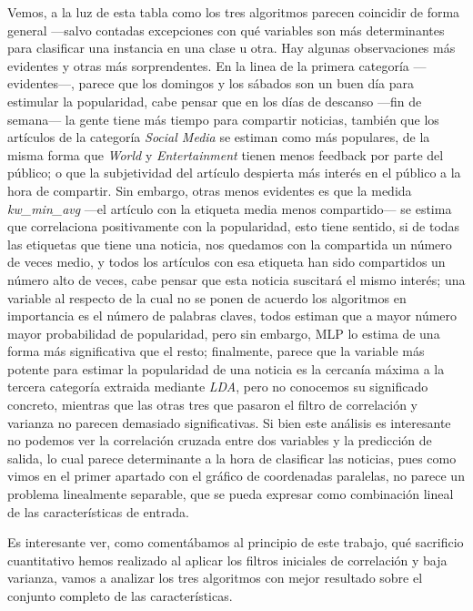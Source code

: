 \documentclass{article}
\begin{document}
Vemos, a la luz de esta tabla como los tres algoritmos parecen coincidir de forma general ---salvo contadas excepciones con qué variables son más determinantes para clasificar una instancia en una clase u otra. Hay algunas observaciones más evidentes y otras más sorprendentes. En la linea de la primera categoría ---evidentes---, parece que los domingos y los sábados son un buen día para estimular la popularidad, cabe pensar que en los días de descanso ---fin de semana--- la gente tiene más tiempo para compartir noticias, también que los artículos de la categoría \textit{Social Media} se estiman como más populares, de la misma forma que \textit{World} y \textit{Entertainment} tienen menos feedback por parte del público; o que la subjetividad del artículo despierta más interés en el público a la hora de compartir. Sin embargo, otras menos evidentes es que la medida \textit{kw\_min\_avg} ---el artículo con la etiqueta media menos compartido--- se estima que correlaciona positivamente con la popularidad, esto tiene sentido, si de todas las etiquetas que tiene una noticia, nos quedamos con la compartida un número de veces medio, y todos los artículos con esa etiqueta han sido compartidos un número alto de veces, cabe pensar que esta noticia suscitará el mismo interés; una variable al respecto de la cual no se ponen de acuerdo los algoritmos en importancia es el número de palabras claves, todos estiman que a mayor número mayor probabilidad de popularidad, pero sin embargo, MLP lo estima de una forma más significativa que el resto; finalmente, parece que la variable más potente para estimar la popularidad de una noticia es la cercanía máxima a la tercera categoría extraida mediante \textit{LDA}, pero no conocemos su significado concreto, mientras que las otras tres que pasaron el filtro de correlación y varianza no parecen demasiado significativas. Si bien este análisis es interesante no podemos ver la correlación cruzada entre dos variables y la predicción de salida, lo cual parece determinante a la hora de clasificar las noticias, pues como vimos en el primer apartado con el gráfico de coordenadas paralelas, no parece un problema linealmente separable, que se pueda expresar como combinación lineal de las características de entrada.

Es interesante ver, como comentábamos al principio de este trabajo, qué sacrificio cuantitativo hemos realizado al aplicar los filtros iniciales de correlación y baja varianza, vamos a analizar los tres algoritmos con mejor resultado sobre el conjunto completo de las características.
\end{document}
